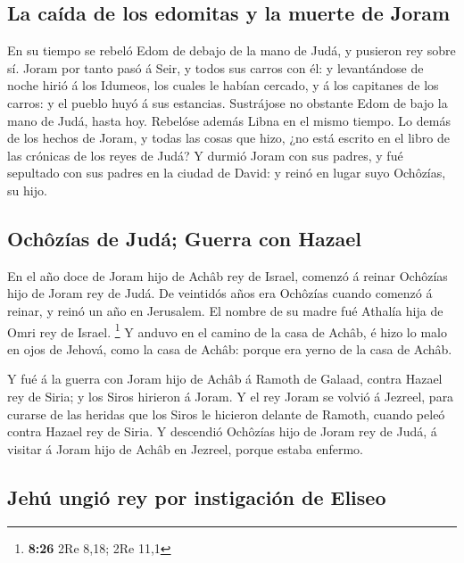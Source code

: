 \hypertarget{la-cauxedda-de-los-edomitas-y-la-muerte-de-joram}{%
\subsection{La caída de los edomitas y la muerte de
Joram}\label{la-cauxedda-de-los-edomitas-y-la-muerte-de-joram}}

 En su tiempo se rebeló Edom de debajo de la mano de
Judá, y pusieron rey sobre sí.  Joram por tanto pasó á
Seir, y todos sus carros con él: y levantándose de noche hirió á los
Idumeos, los cuales le habían cercado, y á los capitanes de los carros:
y el pueblo huyó á sus estancias.  Sustrájose no obstante
Edom de bajo la mano de Judá, hasta hoy. Rebelóse además Libna en el
mismo tiempo.  Lo demás de los hechos de Joram, y todas
las cosas que hizo, ¿no está escrito en el libro de las crónicas de los
reyes de Judá?  Y durmió Joram con sus padres, y fué
sepultado con sus padres en la ciudad de David: y reinó en lugar suyo
Ochôzías, su hijo.

\hypertarget{ochuxf4zuxedas-de-juduxe1-guerra-con-hazael}{%
\subsection{Ochôzías de Judá; Guerra con
Hazael}\label{ochuxf4zuxedas-de-juduxe1-guerra-con-hazael}}

 En el año doce de Joram hijo de Achâb rey de Israel,
comenzó á reinar Ochôzías hijo de Joram rey de Judá.  De
veintidós años era Ochôzías cuando comenzó á reinar, y reinó un año en
Jerusalem. El nombre de su madre fué Athalía hija de Omri rey de Israel.
\footnote{\textbf{8:26} 2Re 8,18; 2Re 11,1}  Y anduvo en
el camino de la casa de Achâb, é hizo lo malo en ojos de Jehová, como la
casa de Achâb: porque era yerno de la casa de Achâb.

 Y fué á la guerra con Joram hijo de Achâb á Ramoth de
Galaad, contra Hazael rey de Siria; y los Siros hirieron á Joram.
 Y el rey Joram se volvió á Jezreel, para curarse de las
heridas que los Siros le hicieron delante de Ramoth, cuando peleó contra
Hazael rey de Siria. Y descendió Ochôzías hijo de Joram rey de Judá, á
visitar á Joram hijo de Achâb en Jezreel, porque estaba enfermo.

\hypertarget{jehuxfa-ungiuxf3-rey-por-instigaciuxf3n-de-eliseo}{%
\subsection{Jehú ungió rey por instigación de
Eliseo}\label{jehuxfa-ungiuxf3-rey-por-instigaciuxf3n-de-eliseo}}

